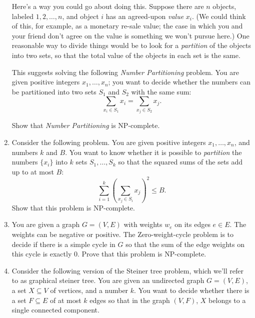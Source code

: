\documentclass[12pt]{article}
\begin{document}
\begin{enumerate}
Here's a way you could go about doing this.
Suppose there are $n$ objects, labeled $1, 2, \ldots, n$,
and object $i$ has an agreed-upon {\em value} $x_i$.
(We could think of this, for example, as a monetary re-sale value;
the case in which you and your friend don't agree on the
value is something we won't pursue here.)
One reasonable way to divide things would be to look
for a {\em partition} of the objects into two sets,
so that the total value of the objects in each set is the same.

This suggests solving the following
{\em Number Partitioning} problem.
You are given positive integers $x_1, \ldots, x_n$;
you want to decide whether
the numbers can be partitioned into
two sets $S_1$ and $S_2$ with the same sum:
$$\sum_{x_i \in S_1} x_i = \sum_{x_j \in S_2} x_j.$$

Show that {\em Number Partitioning} is NP-complete.


\item

Consider the following problem.
You are given positive integers $x_1, \ldots, x_n$, and
numbers $k$ and $B$.
You want to know whether it is possible to {\em partition}
the numbers $\{x_i\}$ into $k$ sets $S_1, \ldots, S_k$
so that the squared sums of the sets add up to at most $B$:
$$\sum_{i=1}^k \left(\sum_{x_j \in S_i} x_j \right)^2 \leq B.$$
Show that this problem is NP-complete.


\item

You are given a graph $G=(V,E)$
with weights $w_e$ on its edges $e \in E$. The weights can be negative
or positive. The {\sc Zero-weight-cycle} problem is to decide if there
is a simple cycle in $G$ so that the sum of the
edge weights on this cycle is exactly $0$.
Prove that this problem is NP-complete.



\item

Consider the following version of the Steiner tree
problem, which we'll refer to as {\sc graphical steiner tree}.
You are given an undirected graph $G = (V,E)$,
a set $X \subseteq V$ of vertices, and a number $k$.
You want to decide whether there is a set $F \subseteq E$ of at
most $k$ edges so that in the graph $(V,F)$,
$X$ belongs to a single connected component.


\end{enumerate}
\end{document}
